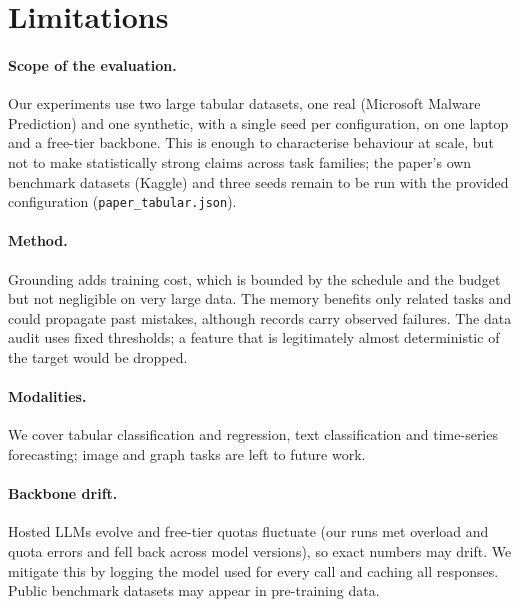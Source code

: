 \section{Limitations}
\label{sec:limitations}

\paragraph{Scope of the evaluation.} Our experiments use two large tabular datasets, one real (Microsoft Malware Prediction) and one synthetic, with a single seed per configuration, on one laptop and a free-tier backbone. This is enough to characterise behaviour at scale, but not to make statistically strong claims across task families; the paper's own benchmark datasets (Kaggle) and three seeds remain to be run with the provided configuration (\texttt{paper\_tabular.json}).

\paragraph{Method.} Grounding adds training cost, which is bounded by the schedule and the budget but not negligible on very large data. The memory benefits only related tasks and could propagate past mistakes, although records carry observed failures. The data audit uses fixed thresholds; a feature that is legitimately almost deterministic of the target would be dropped.

\paragraph{Modalities.} We cover tabular classification and regression, text classification and time-series forecasting; image and graph tasks are left to future work.

\paragraph{Backbone drift.} Hosted LLMs evolve and free-tier quotas fluctuate (our runs met overload and quota errors and fell back across model versions), so exact numbers may drift. We mitigate this by logging the model used for every call and caching all responses. Public benchmark datasets may appear in pre-training data.
